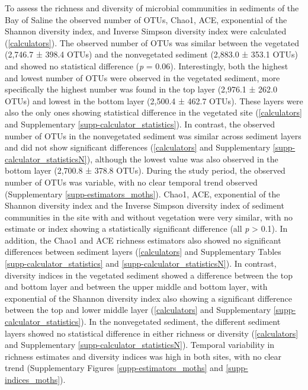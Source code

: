 \documentclass[12pt,]{article}
\begin{document}
To assess the richness and diversity of microbial communities in
sediments of the Bay of Saline the observed number of OTUs, Chao1, ACE,
exponential of the Shannon diversity index, and Inverse Simpson
diversity index were calculated (\autoref{calculators}). The observed
number of OTUs was similar between the vegetated (2,746.7 ± 398.4 OTUs)
and the nonvegetated sediment (2,883.0 ± 353.1 OTUs) and showed no
statistical difference (\emph{p} = 0.06). Interestingly, both the
highest and lowest number of OTUs were observed in the vegetated
sediment, more specifically the highest number was found in the top
layer (2,976.1 ± 262.0 OTUs) and lowest in the bottom layer (2,500.4 ±
462.7 OTUs). These layers were also the only ones showing statistical
difference in the vegetated site (\autoref{calculators} and
Supplementary \autoref{supp-calculator_statistics}). In contrast, the
observed number of OTUs in the nonvegetated sediment was similar across
sediment layers and did not show significant differences
(\autoref{calculators} and Supplementary
\autoref{supp-calculator_statisticsN}), although the lowest value was
also observed in the bottom layer (2,700.8 ± 378.8 OTUs). During the
study period, the observed number of OTUs was variable, with no clear
temporal trend observed (Supplementary \autoref{supp-estimators_moths}).
Chao1, ACE, exponential of the Shannon diversity index and the Inverse
Simpson diversity index of sediment communities in the site with and
without vegetation were very similar, with no estimate or index showing
a statistically significant difference (all \emph{p} \textgreater{}
0.1). In addition, the Chao1 and ACE richness estimators also showed no
significant differences between sediment layers (\autoref{calculators}
and Supplementary Tables \ref{supp-calculator_statistics} and
\ref{supp-calculator_statisticsN}). In contrast, diversity indices in
the vegetated sediment showed a difference between the top and bottom
layer and between the upper middle and bottom layer, with exponential of
the Shannon diversity index also showing a significant difference
between the top and lower middle layer (\autoref{calculators} and
Supplementary \autoref{supp-calculator_statistics}). In the nonvegetated
sediment, the different sediment layers showed no statistical difference
in either richness or diversity (\autoref{calculators} and Supplementary
\autoref{supp-calculator_statisticsN}). Temporal variability in richness
estimates and diversity indices was high in both sites, with no clear
trend (Supplementary Figures \ref{supp-estimators_moths} and
\ref{supp-indices_moths}).
\end{document}
